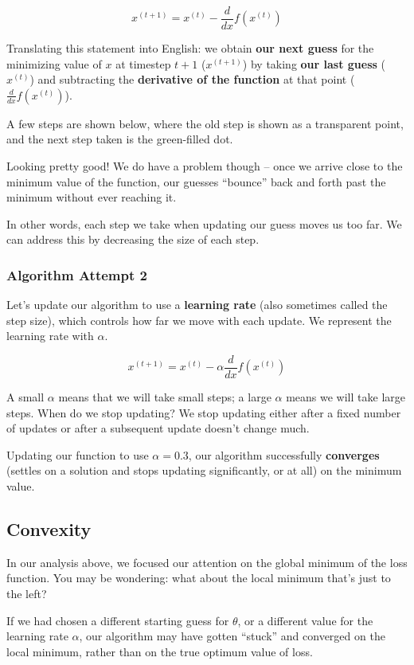 \documentclass[
  letterpaper,
  DIV=11,
  numbers=noendperiod]{scrreprt}
\begin{document}
\[x^{(t+1)} = x^{(t)} - \frac{d}{dx} f(x^{(t)})\]

Translating this statement into English: we obtain \textbf{our next
guess} for the minimizing value of \(x\) at timestep \(t+1\)
(\(x^{(t+1)}\)) by taking \textbf{our last guess} (\(x^{(t)}\)) and
subtracting the \textbf{derivative of the function} at that point
(\(\frac{d}{dx} f(x^{(t)})\)).

A few steps are shown below, where the old step is shown as a
transparent point, and the next step taken is the green-filled dot.

Looking pretty good! We do have a problem though -- once we arrive close
to the minimum value of the function, our guesses ``bounce'' back and
forth past the minimum without ever reaching it.

In other words, each step we take when updating our guess moves us too
far. We can address this by decreasing the size of each step.

\subsubsection{Algorithm Attempt 2}\label{algorithm-attempt-2}

Let's update our algorithm to use a \textbf{learning rate} (also
sometimes called the step size), which controls how far we move with
each update. We represent the learning rate with \(\alpha\).

\[x^{(t+1)} = x^{(t)} - \alpha \frac{d}{dx} f(x^{(t)})\]

A small \(\alpha\) means that we will take small steps; a large
\(\alpha\) means we will take large steps. When do we stop updating? We
stop updating either after a fixed number of updates or after a
subsequent update doesn't change much.

Updating our function to use \(\alpha=0.3\), our algorithm successfully
\textbf{converges} (settles on a solution and stops updating
significantly, or at all) on the minimum value.

\subsection{Convexity}\label{convexity}

In our analysis above, we focused our attention on the global minimum of
the loss function. You may be wondering: what about the local minimum
that's just to the left?

If we had chosen a different starting guess for \(\theta\), or a
different value for the learning rate \(\alpha\), our algorithm may have
gotten ``stuck'' and converged on the local minimum, rather than on the
true optimum value of loss.
\end{document}
